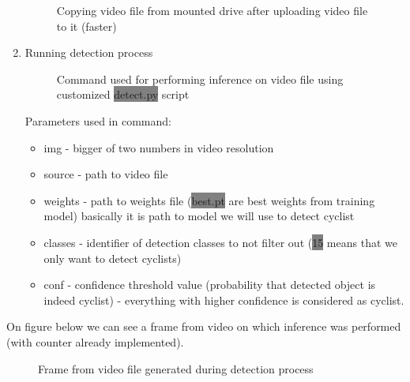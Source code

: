 \begin{enumerate}
\begin{figure} [h]
        \caption{Copying video file from mounted drive after uploading video file to it (faster)}
        \label{fig:inference4}
    \end{figure}
    \item Running detection process
    \newline \begin{figure} [h]
        \centering
        \caption{Command used for performing inference on video file using customized \colorbox{Gray}{detect.py} script}
        \label{fig:inference4}
    \end{figure}
    \newline Parameters used in command:
    \begin{itemize}
        \item img - bigger of two numbers in video resolution
        \item source - path to video file
        \item weights - path to weights file (\colorbox{Gray}{best.pt} are best weights from training model) basically it is path to model we will use to detect cyclist
        \item classes - identifier of detection classes to not filter out (\colorbox{Gray}{15} means that we only want to detect cyclists)
        \item conf - confidence threshold value (probability that detected object is indeed cyclist) - everything with higher confidence is considered as cyclist.
    \end{itemize}
\end{enumerate}
On figure below we can see a frame from video on which inference was performed (with counter already implemented).
\begin{figure} [h]
    \centering
    \caption{Frame from video file generated during detection process}
    \label{fig:inference}
\end{figure}
